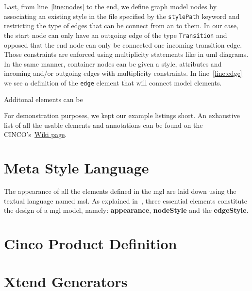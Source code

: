 Last, from line~\ref{line:nodes} to the end, we define graph model nodes by associating an existing style in the file specified by the \lstinline[language=MGL]{stylePath} keyword and restricting the type of edges that can be connect from an to them. In our case, the start node can only have an outgoing edge of the type \lstinline[language=MGL]{Transition} and opposed that the end node can only be connected one incoming transition edge. Those constraints are enforced using multiplicity statements like in \acrfull{uml} diagrams. In the same manner, container nodes can be given a style, attributes and incoming and/or outgoing edges with multiplicity constraints. In line~\ref{line:edge} we see a definition of the \lstinline[language=MGL]{edge} element that will connect model elements.

Additonal elements can be 

For demonstration purposes, we kept our example listings short. An exhaustive list of all the usable elements and annotations can be found on the CINCO's~\href{https://gitlab.com/scce/cinco/-/wikis/Cinco-Product-Specification}{Wiki page}.

\section{Meta Style Language}\label{sec:MSL}
The appearance of all the elements defined in the \acrshort{mgl} are laid down using the textual language named \acrfull{msl}. As explained in~\cite{gitlabcinco}, three essential elements constitute the design of a \acrshort{mgl} model, namely: \textbf{appearance}, \textbf{nodeStyle} and the \textbf{edgeStyle}.

\section{Cinco Product Definition}\label{sec:CPD}

\section{Xtend Generators}\label{sec:GEN}
